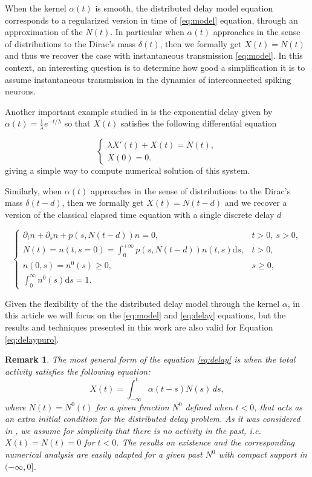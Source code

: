 \documentclass[11pt,a4paper]{article}
\newcommand{\dd}{\mathrm{d}}
\newtheorem{remark}{Remark}[section]
\begin{document}
When the kernel $\alpha(t)$ is smooth, the distributed delay model equation corresponds to a regularized version in time of \eqref{eq:model} equation, through an approximation of the $N(t)$. In particular when $\alpha(t)$ approaches in the sense of distributions to the Dirac's mass $\delta(t)$, then we formally get $X(t)=N(t)$ and thus we recover the case with instantaneous transmission \eqref{eq:model}. In this context, an interesting question is to determine how good a simplification it is to assume instantaneous transmission in the dynamics of interconnected spiking neurons.

Another important example studied in \cite{pakdaman2009dynamics} is the exponential delay given by $\alpha(t)=\frac{1}{\lambda}e^{-t/\lambda}$ so that $X(t)$ satisfies the following differential equation

\begin{equation}
\label{edo-X}
    \begin{cases}
        \lambda X'(t) +X(t)=N(t),\\
        X(0)=0.
    \end{cases}
\end{equation}
giving a simple way to compute numerical solution of this system.

Similarly, when $\alpha(t)$ approaches in the sense of distributions to the Dirac's mass $\delta(t-d)$, then we formally get $X(t)=N(t-d)$ and we recover a version of the classical elapsed time equation with a single discrete delay $d$

\begin{equation}\label{eq:delaypuro}
\begin{cases}
    \partial_tn+\partial_s n+p(s,N(t-d))n = 0,  & t>0,\: s>0, \\
    N(t)=n(t,s=0)= \int_0^{+\infty}p(s,N(t-d))n(t,s) \dd s,& t>0,\\
    n(0,s)=n^0(s)\geq0,& s\geq 0,\\
    \int_0^{\infty}n^0(s)\dd s=1.
\end{cases}
\end{equation}

Given the flexibility of the the distributed delay model through the kernel $\alpha$, in this article we will focus on the \eqref{eq:model} and \eqref{eq:delay} equations, but the results and techniques presented in this work 
are also valid for Equation \eqref{eq:delaypuro}.


\begin{remark}
\label{past}
    The most general form of the equation \eqref{eq:delay} is when the total activity satisfies the following equation:
    \begin{equation*}
    X(t)=\int_{-\infty}^t\alpha(t-s)N(s)\,ds,
    \end{equation*}
    where $N(t)=N^0(t)$ for a given function $N^0$ defined when $t<0$, that acts as an extra initial condition for the distributed delay problem. As it was considered in \cite{pakdaman2009dynamics}, we assume for simplicity that there is no activity in the past, i.e. $X(t)=N(t)=0$ for $t<0$. The results on existence and the corresponding numerical analysis are easily adapted for a given past $N^0$ with compact support in $(-\infty,0]$.
\end{remark}
\end{document}

